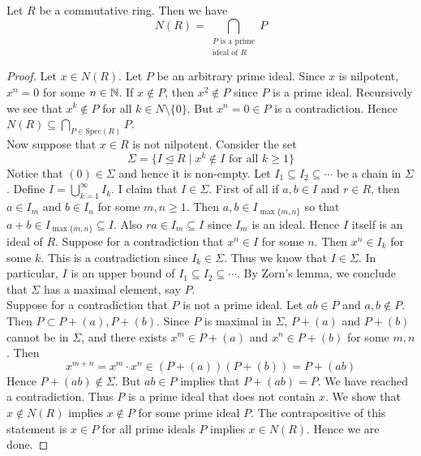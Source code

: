 \documentclass[a4paper]{article}
\begin{document}
\begin{prp}{}{} Let $R$ be a commutative ring. Then we have $$N(R)=\bigcap_{\substack{P\text{ is a prime}\\\text{ideal of }R}}P$$ \tcbline
\begin{proof}
Let $x\in N(R)$. Let $P$ be an arbitrary prime ideal. Since $x$ is nilpotent, $x^n=0$ for some $n\in\mathbb{N}$. If $x\notin P$, then $x^2\notin P$ since $P$ is a prime ideal. Recursively we see that $x^k\notin P$ for all $k\in N\setminus\{0\}$. But $x^n=0\in P$ is a contradiction. Hence $N(R)\subseteq\bigcap_{P\in\text{Spec}(R)}P$. \\

Now suppose that $x\in R$ is not nilpotent. Consider the set $$\Sigma=\{I\trianglelefteq R\;|\;x^k\notin I\text{ for all }k\geq 1\}$$ Notice that $(0)\in\Sigma$ and hence it is non-empty. Let $I_1\subseteq I_2\subseteq\cdots$ be a chain in $\Sigma$. Define $I=\bigcup_{k=1}^\infty I_k$. I claim that $I\in\Sigma$. First of all if $a,b\in I$ and $r\in R$, then $a\in I_m$ and $b\in I_n$ for some $m,n\geq 1$. Then $a,b\in I_{\max\{m,n\}}$ so that $a+b\in I_{\max\{m,n\}}\subseteq I$. Also $ra\in I_m\subseteq I$ since $I_m$ is an ideal. Hence $I$ itself is an ideal of $R$. Suppose for a contradiction that $x^n\in I$ for some $n$. Then $x^n\in I_k$ for some $k$. This is a contradiction since $I_k\in\Sigma$. Thus we know that $I\in\Sigma$. In particular, $I$ is an upper bound of $I_1\subseteq I_2\subseteq\cdots$. By Zorn's lemma, we conclude that $\Sigma$ has a maximal element, say $P$. \\

Suppose for a contradiction that $P$ is not a prime ideal. Let $ab\in P$ and $a,b\notin P$. Then $P\subset P+(a),P+(b)$. Since $P$ is maximal in $\Sigma$, $P+(a)$ and $P+(b)$ cannot be in $\Sigma$, and there exists $x^m\in P+(a)$ and $x^n\in P+(b)$ for some $m,n$. Then $$x^{m+n}=x^m\cdot x^n\in (P+(a))(P+(b))=P+(ab)$$ Hence $P+(ab)\notin\Sigma$. But $ab\in P$ implies that $P+(ab)=P$. We have reached a contradiction. Thus $P$ is a prime ideal that does not contain $x$. We show that $x\notin N(R)$ implies $x\notin P$ for some prime ideal $P$. The contrapositive of this statement is $x\in P$ for all prime ideals $P$ implies $x\in N(R)$. Hence we are done. 
\end{proof}
\end{prp}
\end{document}

